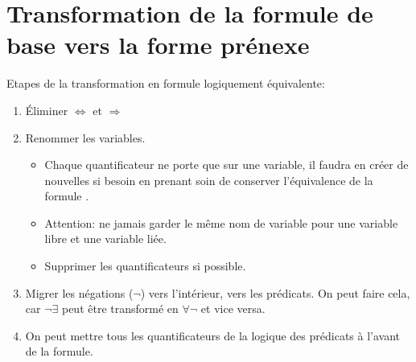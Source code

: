{\section{Transformation de la formule de base vers la forme prénexe}

Etapes de la transformation en formule logiquement équivalente:
\begin{enumerate}
    \item Éliminer $\Leftrightarrow$ et $\Rightarrow$
    \item Renommer les variables. 
    \begin{itemize}
    \item Chaque quantificateur ne porte que sur une variable, il faudra en créer de nouvelles si besoin en prenant soin de conserver l'équivalence de la formule . 
    \item Attention: ne jamais garder le même nom de variable pour une variable libre et une variable liée. 
    \item Supprimer les quantificateurs si possible. \\
    \end{itemize}
    \item Migrer les négations ($\neg$) vers l'intérieur, vers les prédicats. On peut faire cela, car $\neg\exists$ peut être transformé en $\forall\neg$ et vice versa.  
    \item On peut mettre tous les quantificateurs de la logique des prédicats à l'avant de la formule. 
\end{enumerate}
}
